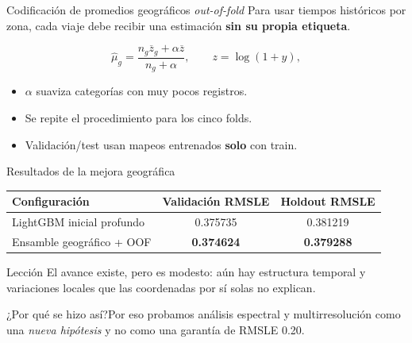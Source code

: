 \documentclass[aspectratio=169,11pt]{beamer}
\newcommand{\porq}[1]{\vspace{1.2mm}\begin{block}{¿Por qué se hizo así?}\small #1\end{block}}
\begin{document}
\begin{frame}{Codificación de promedios geográficos \emph{out-of-fold}}
\small
Para usar tiempos históricos por zona, cada viaje debe recibir una estimación \textbf{sin su propia etiqueta}. 
\vspace{2mm}
\begin{center}
\end{center}
\[
\widehat\mu_g=\frac{n_g\overline z_g+\alpha\overline z}{n_g+\alpha},\qquad z=\log(1+y),
\]
\begin{itemize}
\item \(\alpha\) suaviza categorías con muy pocos registros.
\item Se repite el procedimiento para los cinco folds.
\item Validación/test usan mapeos entrenados \textbf{solo} con train.
\end{itemize}
\end{frame}

\begin{frame}{Resultados de la mejora geográfica}
\small
\begin{center}
\begin{tabular}{lcc}
\toprule
\textbf{Configuración} & \textbf{Validación RMSLE} & \textbf{Holdout RMSLE}\\
\midrule
LightGBM inicial profundo & 0.375735 & 0.381219\\
Ensamble geográfico + OOF & \textbf{0.374624} & \textbf{0.379288}\\
\bottomrule
\end{tabular}
\end{center}
\vspace{2mm}
\begin{block}{Lección}
El avance existe, pero es modesto: aún hay estructura temporal y variaciones locales que las coordenadas por sí solas no explican.
\end{block}
\porq{Por eso probamos análisis espectral y multirresolución como una \emph{nueva hipótesis} y no como una garantía de RMSLE 0.20.}
\end{frame}
\end{document}
